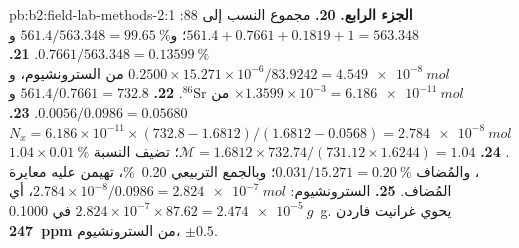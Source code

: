 \begin{solution}{pb:b2:field-lab-methods-2:1}
\noindent\textbf{الجزء الرابع.}
\textbf{20.} مجموع النسب إلى 88: $561.4 + 0.7661 + 0.1819 + 1 = 563.348$؛ و$561.4/563.348 =
\qty{99.65}{\percent}$ و$0.7661/563.348 = \qty{0.13599}{\percent}$.
\textbf{21.} $0.2500 \times 15.271 \times 10^{-6}/83.9242 = \qty{4.549e-8}{mol}$ من السترونشيوم،
و$\times 1.3599 \times 10^{-3} = \qty{6.186e-11}{mol}$ من $^{86}\mathrm{Sr}$.
\textbf{22.} $561.4/0.7661 = 732.8$ و$0.0056/0.0986 = 0.05680$.
\textbf{23.} $N_x = 6.186 \times 10^{-11} \times (732.8 - 1.6812)/(1.6812 - 0.0568) =
\qty{2.784e-8}{mol}$.
\textbf{24.} $\mathcal M = 1.6812 \times 732.74/(731.12 \times 1.6244) = 1.04$؛ تضيف النسبة
$1.04 \times \qty{0.01}{\percent}$، والمُضاف $0.031/15.271 = \qty{0.20}{\percent}$؛ وبالجمع التربيعي
\qty{0.20}{\percent}، تهيمن عليه معايرة المُضاف.
\textbf{25.} السترونشيوم: $2.784 \times 10^{-8}/0.0986 = \qty{2.824e-7}{mol}$، أي $2.824 \times
10^{-7} \times 87.62 = \qty{2.474e-5}{g}$ في \qty{0.1000}{g}. يحوي غرانيت فاردن
\textbf{\qty[text-series-to-math=true]{247}{ppm}} من السترونشيوم، $\pm 0.5$.
\end{solution}

